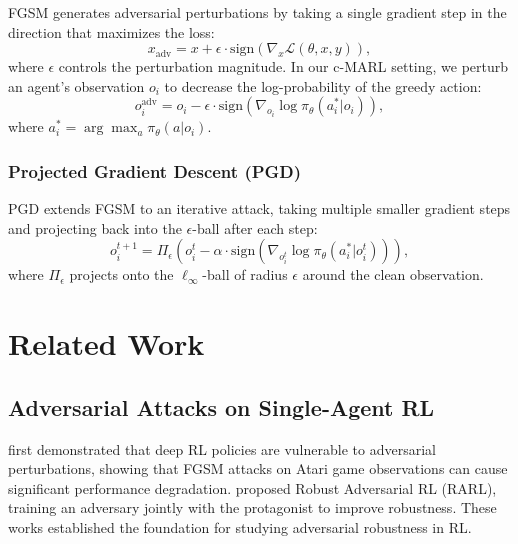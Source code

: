 \documentclass[12pt,a4paper]{article}
\begin{document}
FGSM \citep{goodfellow2015explaining} generates adversarial perturbations by taking a single gradient step in the direction that maximizes the loss:
\begin{equation}
    x_\text{adv} = x + \epsilon \cdot \text{sign}\left(\nabla_x \mathcal{L}(\theta, x, y)\right),
\end{equation}
where $\epsilon$ controls the perturbation magnitude. In our c-MARL setting, we perturb an agent's observation $o_i$ to decrease the log-probability of the greedy action:
\begin{equation}
    o_i^\text{adv} = o_i - \epsilon \cdot \text{sign}\left(\nabla_{o_i} \log \pi_\theta(a^*_i | o_i)\right),
    \label{eq:fgsm_attack}
\end{equation}
where $a^*_i = \arg\max_a \pi_\theta(a | o_i)$.

\subsubsection{Projected Gradient Descent (PGD)}

PGD \citep{madry2018towards} extends FGSM to an iterative attack, taking multiple smaller gradient steps and projecting back into the $\epsilon$-ball after each step:
\begin{equation}
    o_i^{t+1} = \Pi_\epsilon \left( o_i^t - \alpha \cdot \text{sign}\left(\nabla_{o_i^t} \log \pi_\theta(a^*_i | o_i^t) \right) \right),
\end{equation}
where $\Pi_\epsilon$ projects onto the $\ell_\infty$-ball of radius $\epsilon$ around the clean observation.

\section{Related Work}
\label{sec:related}

\subsection{Adversarial Attacks on Single-Agent RL}

\citet{huang2017adversarial} first demonstrated that deep RL policies are vulnerable to adversarial perturbations, showing that FGSM attacks on Atari game observations can cause significant performance degradation. \citet{pinto2017robust} proposed Robust Adversarial RL (RARL), training an adversary jointly with the protagonist to improve robustness. These works established the foundation for studying adversarial robustness in RL.
\end{document}
